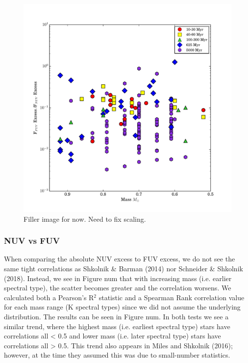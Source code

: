 \documentclass[twocolumn]{aastex62}
\begin{document}
\begin{figure}[t]
\centering
\includegraphics[width=\linewidth]{fuv_nuv_vs_mass_NO_J.pdf}
\caption{Filler image for now. Need to fix scaling. \label{fig:fuv_nuv_vs_mass}}
\end{figure}

\subsubsection{NUV vs FUV}

When comparing the absolute NUV excess to FUV excess, we do not see the same tight correlations as Shkolnik & Barman (2014) nor Schneider & Shkolnik (2018). Instead, we see in Figure num that with increasing mass (i.e. earlier spectral type), the scatter becomes greater and the correlation worsens. We calculated both a Pearson’s R$^2$ statistic and a Spearman Rank correlation value for each mass range (K spectral types) since we did not assume the underlying distribution.  The results can be seen in Figure num. In both tests we see a similar trend, where the highest mass (i.e. earliest spectral type) stars have correlations all < 0.5 and lower mass (i.e. later spectral type) stars have correlations all > 0.5. This trend also appears in Miles and Shkolnik (2016); however, at the time they assumed this was due to small-number statistics. 
\end{document}
